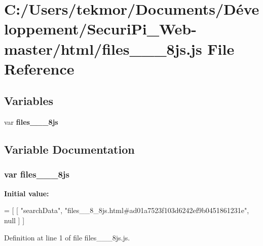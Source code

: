 \section{C\+:/\+Users/tekmor/\+Documents/\+Développement/\+Securi\+Pi\+\_\+\+Web-\/master/html/files\+\_\+\+\_\+\_\+8js.js File Reference}
\label{files____8__8js_8js}
\subsection*{Variables}
\begin{DoxyCompactItemize}
\item 
var {\bf files\+\_\+\+\_\+\_\+8js}
\end{DoxyCompactItemize}


\subsection{Variable Documentation}
\subsubsection[{files\+\_\+\+\_\+8\+\_\+8js}]{\setlength{\rightskip}{0pt plus 5cm}var files\+\_\+\+\_\+\_\+8js}\label{files____8__8js_8js_a3a0b107400baecf554be776ef5da28d6}
{\bfseries Initial value\+:}
\begin{DoxyCode}
=
[
    [ \textcolor{stringliteral}{"searchData"}, \textcolor{stringliteral}{"files\_\_8\_8js.html#ad01a7523f103d6242ef9b0451861231e"}, null ]
]
\end{DoxyCode}


Definition at line 1 of file files\+\_\+\+\_\+\_\+8js.\+js.

